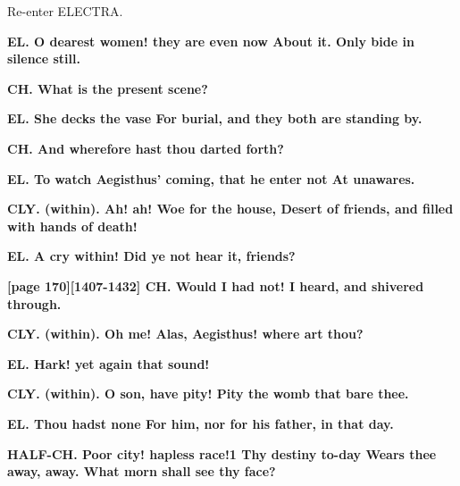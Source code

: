 \documentclass[11pt,letter]{book}
\begin{document}
\par  Re-enter ELECTRA.

\par \textbf{EL. O dearest women! they are even now About it. Only bide in silence still.}
\par 

\par \textbf{CH. What is the present scene?}
\par 

\par \textbf{EL. She decks the vase For burial, and they both are standing by.}
\par 

\par \textbf{CH. And wherefore hast thou darted forth?}
\par 

\par \textbf{EL. To watch Aegisthus’ coming, that he enter not At unawares.}
\par 

\par \textbf{CLY. (within). Ah! ah! Woe for the house, Desert of friends, and filled with hands of death!}
\par 

\par \textbf{EL. A cry within! Did ye not hear it, friends?}
\par 

\par \textbf{[page 170][1407-1432] CH. Would I had not! I heard, and shivered through.}
\par 

\par \textbf{CLY. (within). Oh me! Alas, Aegisthus! where art thou?}
\par 

\par \textbf{EL. Hark! yet again that sound!}
\par 

\par \textbf{CLY. (within). O son, have pity! Pity the womb that bare thee.}
\par 

\par \textbf{EL. Thou hadst none For him, nor for his father, in that day.}
\par 

\par \textbf{HALF-CH. Poor city! hapless race!1 Thy destiny to-day Wears thee away, away. What morn shall see thy face?}
\par 
\end{document}
